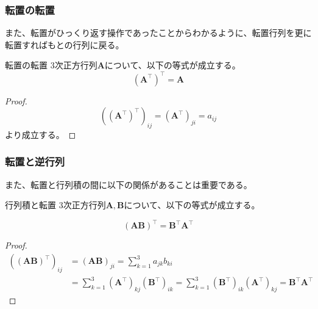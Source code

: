 \subsubsection{転置の転置}
また、転置がひっくり返す操作であったことからわかるように、転置行列を更に転置すればもとの行列に戻る。
\begin{theorem*}{転置の転置}
	3次正方行列\(\boldsymbol{A}\)について、以下の等式が成立する。
	\begin{equation}
		(\boldsymbol{A}^{\top})^{\top}=\boldsymbol{A}
	\end{equation}
\end{theorem*}
\begin{proof}
	\begin{equation}
		\left(\left(\boldsymbol{A}^{\top}\right)^{\top}\right)_{ij}= \left(\boldsymbol{A}^{\top}\right)_{ji}=a_{ij}
	\end{equation}
	より成立する。
\end{proof}
\subsubsection{転置と逆行列}
また、転置と行列積の間に以下の関係があることは重要である。
\begin{theorem*}{行列積と転置}
	3次正方行列\(\boldsymbol{A},\boldsymbol{B}\)について、以下の等式が成立する。

	\begin{equation}
		(\boldsymbol{A}\boldsymbol{B})^{\top}= \boldsymbol{B}^{\top}\boldsymbol{A}^{\top}
	\end{equation}
\end{theorem*}
\begin{proof}
	\begin{equation}
		\begin{aligned}
			\left((\boldsymbol{A} \boldsymbol{B})^{\top}\right)_{ij}
			 & =\left(\boldsymbol{A} \boldsymbol{B}\right)_{ji}
			=\sum^3_{k=1} a_{jk}b_{ki}                                                \\
			 & =\sum^3_{k=1}(\boldsymbol{A}^{\top})_{kj} (\boldsymbol{B}^{\top})_{ik}
			=\sum^3_{k=1}(\boldsymbol{B}^{\top})_{ik}(\boldsymbol{A}^{\top})_{kj}
			= \boldsymbol{B}^{\top}\boldsymbol{A}^{\top}
		\end{aligned}
	\end{equation}
\end{proof}
